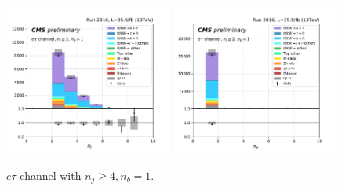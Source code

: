 \begin{figure}[ht]
    \includegraphics[width=0.49\textwidth]{chapters/Appendix/sectionPlots/figures/kinematics_pickles/etau/1b/etau_1b_nJets.pdf}
    \includegraphics[width=0.49\textwidth]{chapters/Appendix/sectionPlots/figures/kinematics_pickles/etau/1b/etau_1b_nBJets.pdf}
    
    \caption{$e\tau$ channel with $n_j\geq4, n_b=1$.}
\end{figure}


